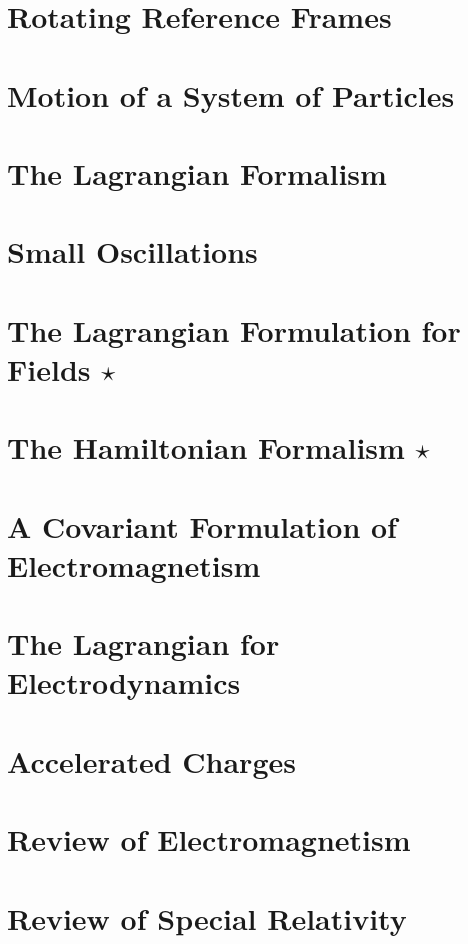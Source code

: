 \documentclass{momento}
\begin{document}

\mainmatter
\chapter{Rotating Reference Frames}
\label{cha:rotat-refer-fram}


\chapter{Motion of a System of Particles}
\label{cha:moti-syst-refer}


\chapter{The Lagrangian Formalism}
\label{cha:lagrangian-formalism}


\chapter{Small Oscillations}
\label{cha:small-oscillations}


\chapter{The Lagrangian Formulation for Fields $\star$}
\label{cha:lagr-form-fields}


\chapter{The Hamiltonian Formalism $\star$}
\label{cha:hamilt-form-star}


\chapter{A Covariant Formulation of Electromagnetism}
\label{cha:covar-form-electr}


\chapter{The Lagrangian for Electrodynamics}
\label{cha:lagr-electr}

\chapter{Accelerated Charges}
\label{cha:accelerated-charges}

\appendix

\chapter{Review of Electromagnetism}
\label{cha:revi-electr}

\chapter{Review of Special Relativity}
\label{cha:revi-spec-relat}



\appendices
\end{document}
